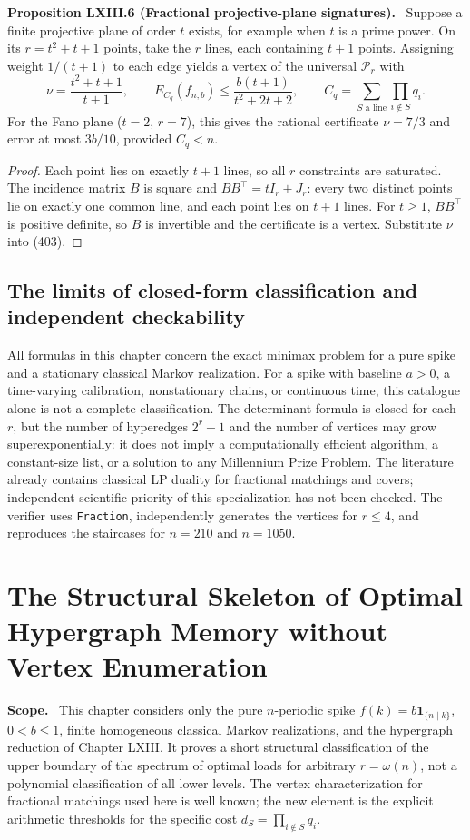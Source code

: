 \documentclass[11pt,a4paper,oneside]{book}
\newcommand{\one}{\mathbf 1}\newcommand{\ii}{\mathrm i}\newcommand{\dd}{\mathrm d}
\newcommand{\statement}[3]{\par\medskip\noindent\textbf{#1 #2 (#3).}\ }
\newcommand{\note}[1]{\par\medskip\noindent\textbf{#1}\ }
\begin{document}
\statement{Proposition}{LXIII.6}{Fractional projective-plane signatures}
Suppose a finite projective plane of order $t$ exists, for example when $t$ is a prime power. On its $r=t^2+t+1$ points, take the $r$ lines, each containing $t+1$ points. Assigning weight $1/(t+1)$ to each edge yields a vertex of the universal $\mathcal P_r$ with
\begin{equation}
\nu=\frac{t^2+t+1}{t+1},\qquad
E_{C_q}(f_{n,b})\le\frac{b(t+1)}{t^2+2t+2},\qquad
C_q=\sum_{S\text{ a line}}\prod_{i\notin S}q_i.\tag{412}
\end{equation}
For the Fano plane ($t=2$, $r=7$), this gives the rational certificate $\nu=7/3$ and error at most $3b/10$, provided $C_q<n$.
\begin{proof}
Each point lies on exactly $t+1$ lines, so all $r$ constraints are saturated. The incidence matrix $B$ is square and $BB^\top=tI_r+J_r$: every two distinct points lie on exactly one common line, and each point lies on $t+1$ lines. For $t\ge1$, $BB^\top$ is positive definite, so $B$ is invertible and the certificate is a vertex. Substitute $\nu$ into (403).
\end{proof}

\section{The limits of closed-form classification and independent checkability}
All formulas in this chapter concern the exact minimax problem for a pure spike and a stationary classical Markov realization. For a spike with baseline $a>0$, a time-varying calibration, nonstationary chains, or continuous time, this catalogue alone is not a complete classification. The determinant formula is closed for each $r$, but the number of hyperedges $2^r-1$ and the number of vertices may grow superexponentially: it does not imply a computationally efficient algorithm, a constant-size list, or a solution to any Millennium Prize Problem. The literature already contains classical LP duality for fractional matchings and covers; independent scientific priority of this specialization has not been checked. The verifier  uses \texttt{Fraction}, independently generates the vertices for $r\le4$, and reproduces the staircases for $n=210$ and $n=1050$.
\setcounter{equation}{412}


\chapter{The Structural Skeleton of Optimal Hypergraph Memory without Vertex Enumeration}
\note{Scope.} This chapter considers only the pure $n$-periodic spike $f(k)=b\one_{\{n\mid k\}}$, $0<b\le1$, finite homogeneous classical Markov realizations, and the hypergraph reduction of Chapter LXIII. It proves a short structural classification of the upper boundary of the spectrum of optimal loads for arbitrary $r=\omega(n)$, not a polynomial classification of all lower levels. The vertex characterization for fractional matchings used here is well known; the new element is the explicit arithmetic thresholds for the specific cost $d_S=\prod_{i\notin S}q_i$.
\end{document}
